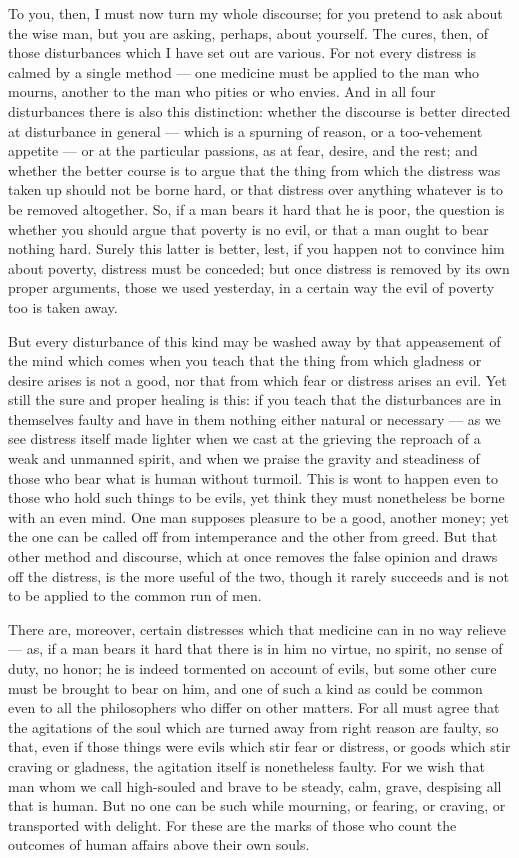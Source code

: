  To you, then, I must now turn my whole discourse; for you pretend to ask about the wise man, but you are asking, perhaps, about yourself. The cures, then, of those disturbances which I have set out are various. For not every distress is calmed by a single method — one medicine must be applied to the man who mourns, another to the man who pities or who envies. And in all four disturbances there is also this distinction: whether the discourse is better directed at disturbance in general — which is a spurning of reason, or a too-vehement appetite — or at the particular passions, as at fear, desire, and the rest; and whether the better course is to argue that the thing from which the distress was taken up should not be borne hard, or that distress over anything whatever is to be removed altogether. So, if a man bears it hard that he is poor, the question is whether you should argue that poverty is no evil, or that a man ought to bear nothing hard. Surely this latter is better, lest, if you happen not to convince him about poverty, distress must be conceded; but once distress is removed by its own proper arguments, those we used yesterday, in a certain way the evil of poverty too is taken away.

 But every disturbance of this kind may be washed away by that appeasement of the mind which comes when you teach that the thing from which gladness or desire arises is not a good, nor that from which fear or distress arises an evil. Yet still the sure and proper healing is this: if you teach that the disturbances are in themselves faulty and have in them nothing either natural or necessary — as we see distress itself made lighter when we cast at the grieving the reproach of a weak and unmanned spirit, and when we praise the gravity and steadiness of those who bear what is human without turmoil. This is wont to happen even to those who hold such things to be evils, yet think they must nonetheless be borne with an even mind. One man supposes pleasure to be a good, another money; yet the one can be called off from intemperance and the other from greed. But that other method and discourse, which at once removes the false opinion and draws off the distress, is the more useful of the two, though it rarely succeeds and is not to be applied to the common run of men.

 There are, moreover, certain distresses which that medicine can in no way relieve — as, if a man bears it hard that there is in him no virtue, no spirit, no sense of duty, no honor; he is indeed tormented on account of evils, but some other cure must be brought to bear on him, and one of such a kind as could be common even to all the philosophers who differ on other matters. For all must agree that the agitations of the soul which are turned away from right reason are faulty, so that, even if those things were evils which stir fear or distress, or goods which stir craving or gladness, the agitation itself is nonetheless faulty. For we wish that man whom we call high-souled and brave to be steady, calm, grave, despising all that is human. But no one can be such while mourning, or fearing, or craving, or transported with delight. For these are the marks of those who count the outcomes of human affairs above their own souls.

